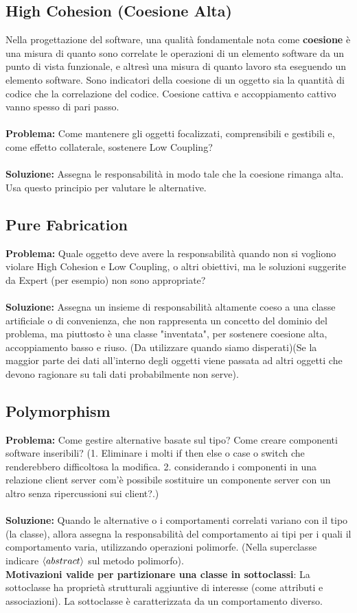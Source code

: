 \documentclass{article}
\numberwithin{equation}{subsection}
\begin{document}
\subsection{High Cohesion (Coesione Alta)}
Nella progettazione del software, una qualità fondamentale nota come \textbf{coesione} è una misura di quanto sono correlate le operazioni di un elemento software da un punto di vista funzionale, e altresì una misura di quanto lavoro sta eseguendo un elemento software. Sono indicatori della coesione di un oggetto sia la quantità di codice che la correlazione del codice. Coesione cattiva e accoppiamento cattivo vanno spesso di pari passo.\\\\
\textbf{Problema: }Come mantenere gli oggetti focalizzati, comprensibili e gestibili e, come effetto collaterale, sostenere Low Coupling?\\\\
\textbf{Soluzione: }Assegna le responsabilità in modo tale che la coesione rimanga alta. Usa questo principio per valutare le alternative.
\subsection{Pure Fabrication}
\textbf{Problema: }Quale oggetto deve avere la responsabilità quando non si vogliono violare High Cohesion e Low Coupling, o altri obiettivi, ma le soluzioni suggerite da Expert (per esempio) non sono appropriate?\\\\
\textbf{Soluzione: }Assegna un insieme di responsabilità altamente coeso a una classe artificiale o di convenienza, che non rappresenta un concetto del dominio del problema, ma piuttosto è una classe "inventata", per sostenere coesione alta, accoppiamento basso e riuso. (Da utilizzare quando siamo disperati)(Se la maggior parte dei dati all'interno degli oggetti viene passata ad altri oggetti che devono ragionare su tali dati probabilmente non serve).
\subsection{Polymorphism}
\textbf{Problema: }Come gestire alternative basate sul tipo? Come creare componenti software inseribili? (1. Eliminare i molti if then else o case o switch che renderebbero difficoltosa la modifica. 2. considerando i componenti in una relazione client server com'è possibile sostituire un componente server con un altro senza ripercussioni sui client?.)\\\\
\textbf{Soluzione: }Quando le alternative o i comportamenti correlati variano con il tipo (la classe), allora assegna la responsabilità del comportamento ai tipi per i quali il comportamento varia, utilizzando operazioni polimorfe. (Nella superclasse indicare $\braket{abstract}$ sul metodo polimorfo).\\
\textbf{Motivazioni valide per partizionare una classe in sottoclassi}: La sottoclasse ha proprietà strutturali aggiuntive di interesse (come attributi e associazioni). La sottoclasse è caratterizzata da un comportamento diverso.
\end{document}
